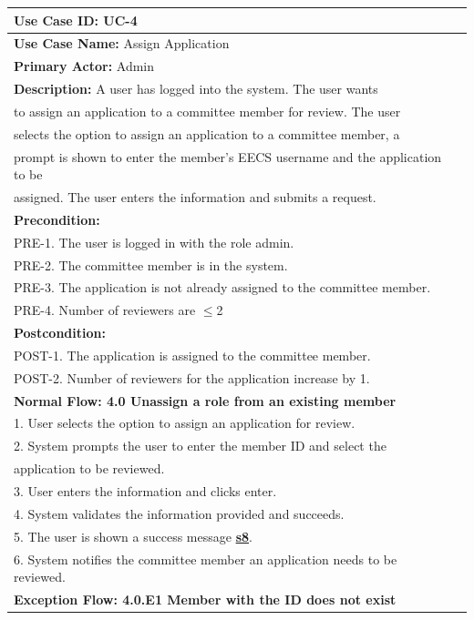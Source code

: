 \documentclass[fontsize=12pt,paper=letter,twoside]{scrartcl}
\begin{document}
\begin{table}[!htb]
\begin{center}
\begin{tabular}{|l|l|}
\hline
\textbf{Use Case ID:} UC-4 \\ \hline
\textbf{Use Case Name:} Assign Application \\ \hline
\textbf {Primary Actor:} Admin \\ \hline
\textbf{Description:} A user has logged into the system. The user wants \\to assign an application to a committee member for review. The user \\selects the option to assign an application to a committee member, a \\prompt is shown to enter the member's EECS username and the application to be \\assigned. The user enters the information and submits a request.\\ \hline
\textbf{Precondition:}
\\ PRE-1. The user is logged in with the role admin.
\\ PRE-2. The committee member is in the system.
\\ PRE-3. The application is not already assigned to the committee member.
\\ PRE-4. Number of reviewers are $\leq$2\\ \hline
\textbf{Postcondition:}
\\ POST-1. The application is assigned to the committee member.
\\ POST-2. Number of reviewers for the application increase by 1. \\ \hline
\textbf{Normal Flow: 4.0 Unassign a role from an existing member}
\\ 1. User selects the option to assign an application for review.
\\ 2. System prompts the user to enter the member ID and select the \\application to be reviewed.
\\ 3. User enters the information and clicks enter.
\\ 4. System validates the information provided and succeeds.
\\ 5. The user is shown a success message \hyperref[app:success]{\textbf{s8}}.
\\ 6. System notifies the committee member an application needs to be reviewed.\\ \hline
\textbf{Exception Flow: 4.0.E1 Member with the ID does not exist}

\end{tabular}
\end{center}
\end{table}
\end{document}

